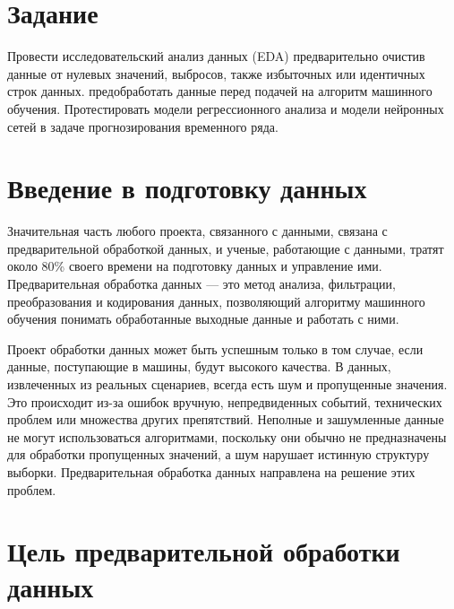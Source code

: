 \documentclass[oneside,14pt]{extarticle} %
\begin{document}
\begin{titlepage}
\begin{flushleft}
		\end{flushleft}
		\vfill
		\begin{center}
			
			\fontsize{12}{12}\selectfont{Старый Оскол, \yeardate\today}
			
		\end{center}
			
	\end{titlepage}
	\setcounter{page}{2}
	
	\section{Задание}
	
	Провести исследовательский анализ данных (EDA) предварительно очистив данные от нулевых значений, выбросов, также избыточных или идентичных строк данных. предобработать данные перед подачей на алгоритм машинного обучения. Протестировать модели регрессионного анализа и модели нейронных сетей в задаче прогнозирования временного ряда.
	 
	
	\section{Введение в подготовку данных}
	
	Значительная часть любого проекта, связанного с данными, связана с предварительной обработкой данных, и ученые, работающие с данными, тратят около 80\% своего времени на подготовку данных и управление ими. Предварительная обработка данных — это метод анализа, фильтрации, преобразования и кодирования данных, позволяющий алгоритму машинного обучения понимать обработанные выходные данные и работать с ними.
	
	
	Проект обработки данных может быть успешным только в том случае, если данные, поступающие в машины, будут высокого качества. В данных, извлеченных из реальных сценариев, всегда есть шум и пропущенные значения. Это происходит из-за ошибок вручную, непредвиденных событий, технических проблем или множества других препятствий. Неполные и зашумленные данные не могут использоваться алгоритмами, поскольку они обычно не предназначены для обработки пропущенных значений, а шум нарушает истинную структуру выборки. Предварительная обработка данных направлена на решение этих проблем.
	
	\section{Цель предварительной обработки данных}
	
\end{document}
